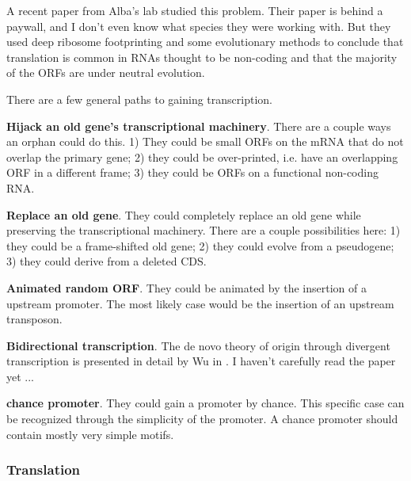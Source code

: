 A recent paper from Alba's lab \cite{ruiz2018translation} studied this problem.
Their paper is behind a paywall, and I don't even know what species they were
working with. But they used deep ribosome footprinting and some evolutionary
methods to conclude that translation is common in RNAs thought to be non-coding
and that the majority of the ORFs are under neutral evolution.


There are a few general paths to gaining transcription. 

{\bf Hijack an old gene's transcriptional machinery}. There are a couple ways
an orphan could do this. 1) They could be small ORFs on the mRNA that do not
overlap the primary gene; 2) they could be over-printed, i.e. have an
overlapping ORF in a different frame; 3) they could be ORFs on a functional
non-coding RNA.

{\bf Replace an old gene}. They could completely replace an old gene while
preserving the transcriptional machinery. There are a couple possibilities
here: 1) they could be a frame-shifted old gene; 2) they could evolve from a
pseudogene; 3) they could derive from a deleted CDS. 

{\bf Animated random ORF}. They could be animated by the insertion of a
upstream promoter. The most likely case would be the insertion of an upstream
transposon.  

{\bf Bidirectional transcription}. The de novo theory of origin through
divergent transcription is presented in detail by Wu in \cite{wu2013divergent}.
I haven't carefully read the paper yet ...


{\bf chance promoter}. They could gain a promoter by chance. This specific case
can be recognized through the simplicity of the promoter. A chance promoter
should contain mostly very simple motifs. 


\subsubsection{Translation}

